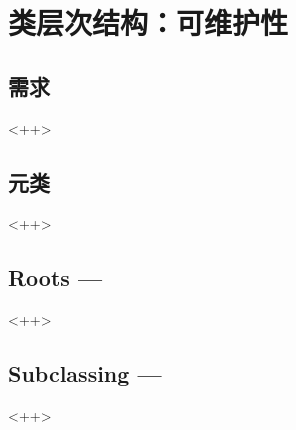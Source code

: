 

\chapter{类层次结构：可维护性}

\section{需求}<++>

\section{元类}<++>

\section{Roots ---}<++>

\section{Subclassing ---}<++>

